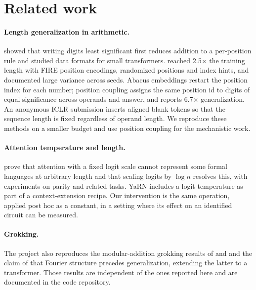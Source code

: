\documentclass{article}
\begin{document}
\section{Related work}

\paragraph{Length generalization in arithmetic.} \citet{lee2023teaching} showed that writing digits least significant first reduces addition to a per-position rule and studied data formats for small transformers. \citet{zhou2024transformers} reached 2.5$\times$ the training length with FIRE position encodings, randomized positions and index hints, and documented large variance across seeds. Abacus embeddings \citep{mcleish2024transformers} restart the position index for each number; position coupling \citep{cho2024position} assigns the same position id to digits of equal significance across operands and answer, and reports 6.7$\times$ generalization. An anonymous ICLR submission \citep{aba2025} inserts aligned blank tokens so that the sequence length is fixed regardless of operand length. We reproduce these methods on a smaller budget and use position coupling for the mechanistic work.

\paragraph{Attention temperature and length.} \citet{chiang2022overcoming} prove that attention with a fixed logit scale cannot represent some formal languages at arbitrary length and that scaling logits by $\log n$ resolves this, with experiments on parity and related tasks. YaRN \citep{peng2023yarn} includes a logit temperature as part of a context-extension recipe. Our intervention is the same operation, applied post hoc as a constant, in a setting where its effect on an identified circuit can be measured.

\paragraph{Grokking.} The project also reproduces the modular-addition grokking results of \citet{power2022grokking} and \citet{nanda2023progress} and the claim of \citet{swaroop2026latent} that Fourier structure precedes generalization, extending the latter to a transformer. Those results are independent of the ones reported here and are documented in the code repository.
\end{document}
